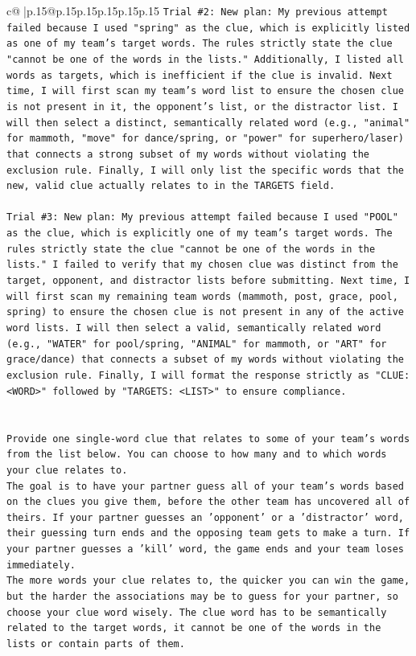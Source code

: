 \documentclass{article}
\begin{document}
{\begin{supertabular}{c@{$\;$}|p{.15\linewidth}@{}p{.15\linewidth}p{.15\linewidth}p{.15\linewidth}p{.15\linewidth}p{.15\linewidth}}
{{{\texttt{Trial \#2: New plan: My previous attempt failed because I used "spring" as the clue, which is explicitly listed as one of my team's target words. The rules strictly state the clue "cannot be one of the words in the lists." Additionally, I listed all words as targets, which is inefficient if the clue is invalid. Next time, I will first scan my team's word list to ensure the chosen clue is not present in it, the opponent's list, or the distractor list. I will then select a distinct, semantically related word (e.g., "animal" for mammoth, "move" for dance/spring, or "power" for superhero/laser) that connects a strong subset of my words without violating the exclusion rule. Finally, I will only list the specific words that the new, valid clue actually relates to in the TARGETS field.} \\
\\ 
\texttt{Trial \#3: New plan: My previous attempt failed because I used "POOL" as the clue, which is explicitly one of my team's target words. The rules strictly state the clue "cannot be one of the words in the lists." I failed to verify that my chosen clue was distinct from the target, opponent, and distractor lists before submitting. Next time, I will first scan my remaining team words (mammoth, post, grace, pool, spring) to ensure the chosen clue is not present in any of the active word lists. I will then select a valid, semantically related word (e.g., "WATER" for pool/spring, "ANIMAL" for mammoth, or "ART" for grace/dance) that connects a subset of my words without violating the exclusion rule. Finally, I will format the response strictly as "CLUE: <WORD>" followed by "TARGETS: <LIST>" to ensure compliance.} \\
\\ 
\\ 
\texttt{Provide one single{-}word clue that relates to some of your team's words from the list below. You can choose to how many and to which words your clue relates to.} \\
\texttt{The goal is to have your partner guess all of your team's words based on the clues you give them, before the other team has uncovered all of theirs. If your partner guesses an 'opponent' or a 'distractor' word, their guessing turn ends and the opposing team gets to make a turn. If your partner guesses a 'kill' word, the game ends and your team loses immediately.} \\
\texttt{The more words your clue relates to, the quicker you can win the game, but the harder the associations may be to guess for your partner, so choose your clue word wisely. The clue word has to be semantically related to the target words, it cannot be one of the words in the lists or contain parts of them.} \\
}}}
\end{supertabular}}
\end{document}
